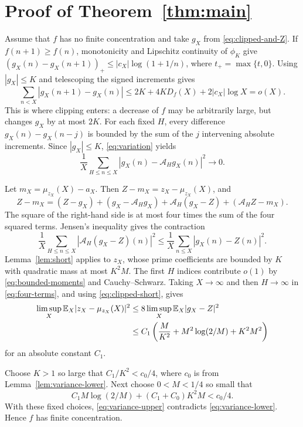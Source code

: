 \documentclass[11pt]{article}
\numberwithin{equation}{section}
\newcommand{\E}{\mathbb E}
\newcommand{\clip}{\phi_K}
\begin{document}
\section{Proof of Theorem~\ref{thm:main}}

Assume that $f$ has no finite concentration and take $g_X$ from
\eqref{eq:clipped-and-Z}. If $f(n+1)\ge f(n)$, monotonicity and Lipschitz
continuity of $\clip$ give
$(g_X(n)-g_X(n+1))_+\le |c_X|\log(1+1/n)$, where $t_+=\max\{t,0\}$.
Using $|g_X|\le K$ and telescoping the signed increments gives
\begin{equation}\label{eq:variation}
 \sum_{n<X}|g_X(n+1)-g_X(n)|
 \le2K+4KD_f(X)+2|c_X|\log X=o(X).
\end{equation}
This is where clipping enters: a decrease of $f$ may be arbitrarily
large, but changes $g_X$ by at most $2K$.
For each fixed $H$, every difference $g_X(n)-g_X(n-j)$ is bounded by
the sum of the $j$ intervening absolute increments. Since $|g_X|\le K$,
\eqref{eq:variation} yields
\begin{equation}\label{eq:clipped-short}
 \frac1X\sum_{H\le n\le X}|g_X(n)-\mathcal A_H g_X(n)|^2\longrightarrow0.
\end{equation}

Let $m_X=\mu_{z_X}(X)-a_X$. Then $Z-m_X=z_X-\mu_{z_X}(X)$, and
\begin{equation}\label{eq:four-terms}
 Z-m_X=(Z-g_X)+(g_X-\mathcal A_H g_X)
            +\mathcal A_H(g_X-Z)+(\mathcal A_H Z-m_X).
\end{equation}
The square of the right-hand side is at most four times the sum of
the four squared terms. Jensen's inequality gives the contraction
\[
 \frac1X\sum_{H\le n\le X}|\mathcal A_H(g_X-Z)(n)|^2
 \le\frac1X\sum_{n\le X}|g_X(n)-Z(n)|^2.
\]
Lemma~\ref{lem:short} applies to $z_X$, whose prime coefficients are
bounded by $K$ with quadratic mass at most $K^2M$. The first $H$
indices contribute $o(1)$ by \eqref{eq:bounded-moments} and
Cauchy--Schwarz. Taking $X\to\infty$ and then $H\to\infty$ in
\eqref{eq:four-terms}, and using \eqref{eq:clipped-short}, gives
\begin{align}
 \limsup_X\E_X|z_X-\mu_{z_X}(X)|^2
 &\le8\limsup_X\E_X|g_X-Z|^2\notag\\
 &\le C_1\left(\frac M{K^2}+M^2\log(2/M)+K^2M^2\right)
       \label{eq:variance-upper}
\end{align}
for an absolute constant $C_1$.

Choose $K>1$ so large that $C_1/K^2<c_0/4$, where $c_0$ is from
Lemma~\ref{lem:variance-lower}. Next choose $0<M<1/4$ so small that
\[
 C_1M\log(2/M)+(C_1+C_0)K^2M<c_0/4.
\]
With these fixed choices, \eqref{eq:variance-upper} contradicts
\eqref{eq:variance-lower}. Hence $f$ has finite concentration.
\end{document}
